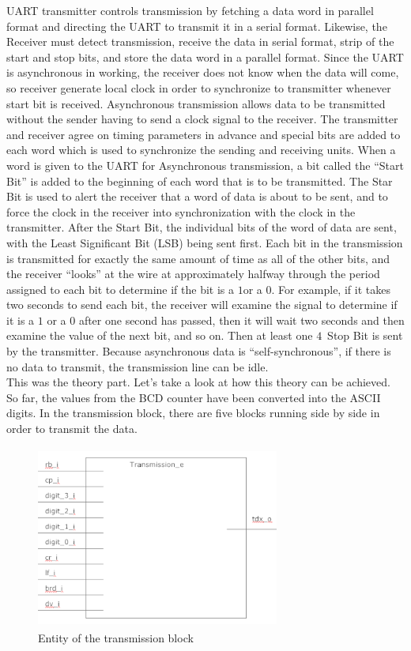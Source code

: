 \documentclass[12pt,a4paper]{article}
\begin{document}
UART transmitter controls transmission by fetching a data word in parallel format and directing the UART to transmit it in a serial format. Likewise, the Receiver must detect transmission, receive the data in serial format, strip of the start and stop bits, and store the data word in a parallel format. Since the UART is asynchronous in working, the receiver does not know when the data will come, so receiver generate local clock in order to synchronize to transmitter whenever start bit is received. Asynchronous transmission allows data to be transmitted without the sender having to send a clock signal to the receiver. The transmitter and receiver agree on timing parameters in advance and special bits are added to each word which is used to synchronize the sending and receiving units. When a word is given to the UART for Asynchronous transmission, a bit called the “Start Bit” is added to the beginning of each word that is to be transmitted. The Star Bit is used to alert the receiver that a word of data is about to be sent, and to force the clock in the receiver into synchronization with the clock in the transmitter. After the Start Bit, the individual bits of the word of data are sent, with the Least Significant Bit (LSB) being sent first. Each bit in the transmission is transmitted 
for exactly the same amount of time as all of the other bits, and the receiver “looks” at the wire at approximately halfway through the period assigned to each bit to determine if the bit is a $1$or a $0$. For example, if it takes two seconds to send each bit, the receiver will examine the signal to determine if it is a $1$ or a $0$ after one second has passed, then it will wait two seconds and then examine the value of the next bit, and so on. Then at least one $4$\ Stop Bit is sent by the transmitter. Because asynchronous data is “self-synchronous”, if there is no data to transmit, the transmission line can be idle.\\

This was the theory part. Let’s take a look at how this theory can be achieved. So far, the values from the BCD counter have been converted into the ASCII digits. In the transmission block, there are five blocks running side by side in order to transmit the data. \\


\begin{figure}[H]
\centering
\includegraphics[width=8cm,height=6cm]{transmissionE.PNG}
\caption{Entity of the transmission block}
\label{Entity of the transmission block}
\end{figure}
\end{document}
